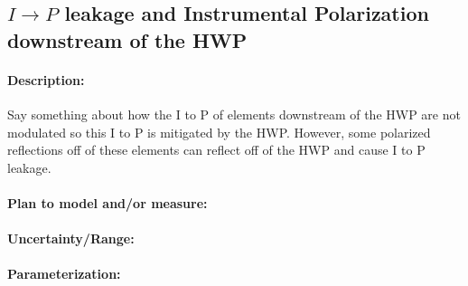 \subsection{$I\rightarrow P$ leakage and Instrumental Polarization downstream of the HWP}
\label{IP downstream of HWP}
\paragraph{Description:}
Say something about how the I to P of elements downstream of the HWP are not modulated so this I to P is mitigated by the HWP. However, some polarized reflections off of these elements can reflect off of the HWP and cause I to P leakage.

\paragraph{Plan to model and/or measure:}

\paragraph{Uncertainty/Range:}

\paragraph{Parameterization:}
